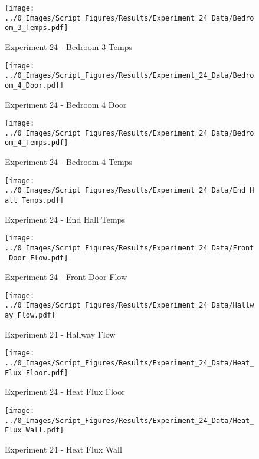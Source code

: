 	\begin{figure}[H]
		\centering
		\texttt{[image: ../0\_Images/Script\_Figures/Results/Experiment\_24\_Data/Bedroom\_3\_Temps.pdf]}
		\caption[]{Experiment 24 - Bedroom 3 Temps}
	\end{figure}
 
	\clearpage

	\begin{figure}[H]
		\centering
		\texttt{[image: ../0\_Images/Script\_Figures/Results/Experiment\_24\_Data/Bedroom\_4\_Door.pdf]}
		\caption[]{Experiment 24 - Bedroom 4 Door}
	\end{figure}
 

	\begin{figure}[H]
		\centering
		\texttt{[image: ../0\_Images/Script\_Figures/Results/Experiment\_24\_Data/Bedroom\_4\_Temps.pdf]}
		\caption[]{Experiment 24 - Bedroom 4 Temps}
	\end{figure}
 
	\clearpage

	\begin{figure}[H]
		\centering
		\texttt{[image: ../0\_Images/Script\_Figures/Results/Experiment\_24\_Data/End\_Hall\_Temps.pdf]}
		\caption[]{Experiment 24 - End Hall Temps}
	\end{figure}
 

	\begin{figure}[H]
		\centering
		\texttt{[image: ../0\_Images/Script\_Figures/Results/Experiment\_24\_Data/Front\_Door\_Flow.pdf]}
		\caption[]{Experiment 24 - Front Door Flow}
	\end{figure}
 
	\clearpage

	\begin{figure}[H]
		\centering
		\texttt{[image: ../0\_Images/Script\_Figures/Results/Experiment\_24\_Data/Hallway\_Flow.pdf]}
		\caption[]{Experiment 24 - Hallway Flow}
	\end{figure}
 

	\begin{figure}[H]
		\centering
		\texttt{[image: ../0\_Images/Script\_Figures/Results/Experiment\_24\_Data/Heat\_Flux\_Floor.pdf]}
		\caption[]{Experiment 24 - Heat Flux Floor}
	\end{figure}
 
	\clearpage

	\begin{figure}[H]
		\centering
		\texttt{[image: ../0\_Images/Script\_Figures/Results/Experiment\_24\_Data/Heat\_Flux\_Wall.pdf]}
		\caption[]{Experiment 24 - Heat Flux Wall}
	\end{figure}
 

